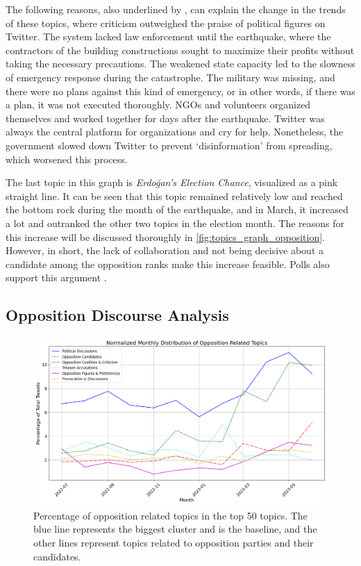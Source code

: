 The following reasons, also underlined by \textcite{cevik_aksoy_turkey_earthquake_2023}, can explain 
the change in the trends of these topics, where criticism outweighed the praise of political figures 
on Twitter. The system lacked law enforcement until the earthquake, where the 
contractors of the building constructions sought to maximize their profits without taking the 
necessary precautions. 
The weakened state capacity led to the slowness of emergency response during the catastrophe. 
The military was missing, and there were no plans against this kind of emergency, or in other words, 
if there was a plan, it was not executed thoroughly. 
NGOs and volunteers organized themselves and worked together for days after the earthquake. Twitter was always 
the central platform for organizations and cry for help. Nonetheless, the government slowed down 
Twitter to prevent `disinformation' from spreading, which worsened this process.

The last topic in this graph is \textit{Erdoğan's Election Chance}, visualized as a pink straight line. 
It can be seen that this topic remained relatively low and reached the bottom rock during the month 
of the earthquake, and in March, it increased a lot and outranked the other two topics in the election 
month. The reasons for this increase will be discussed thoroughly in \autoref{fig:topics_graph_opposition}. 
However, in short, the lack of collaboration and not being decisive about a candidate among the 
opposition ranks make this increase feasible. Polls also support this 
argument \parencite{cevik_aksoy_turkey_earthquake_2023}.

\subsection{Opposition Discourse Analysis}

\begin{figure}[htb]
    \centering
    \includegraphics[width=\linewidth]{figures/normalized_opposition_selected_topics_distribution_with_styles.png}
    \caption[Normalized monthly distribution of opposition related topics]
    {Percentage of opposition related topics in the top 50 topics. 
    The blue line represents the biggest cluster and is the baseline, 
    and the other lines represent topics related to opposition parties and their candidates.}\label{fig:topics_graph_opposition}
\end{figure}

